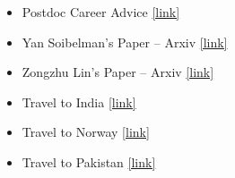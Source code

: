 \documentclass{article}
\begin{document}
\begin{itemize}[label=$\star$]
\item Postdoc Career Advice
\href{https://math.ou.edu/~kmartin/career-ad.html}{[link]}
\item Yan Soibelman's Paper -- Arxiv
\href{https://arxiv.org/search/math?query=yan+soibelman&searchtype=author}{[link]}
\item Zongzhu Lin's Paper -- Arxiv
\href{https://arxiv.org/search/math?query=zongzhu+lin&searchtype=author}{[link]}
\item Travel to India
\href{https://www.incredibleindia.gov.in/en}{[link]}
\item Travel to Norway
\href{https://www.visitnorway.com/}{[link]}
\item Travel to Pakistan
\href{https://tourism.gov.pk/}{[link]}
\end{itemize}
\end{document}
